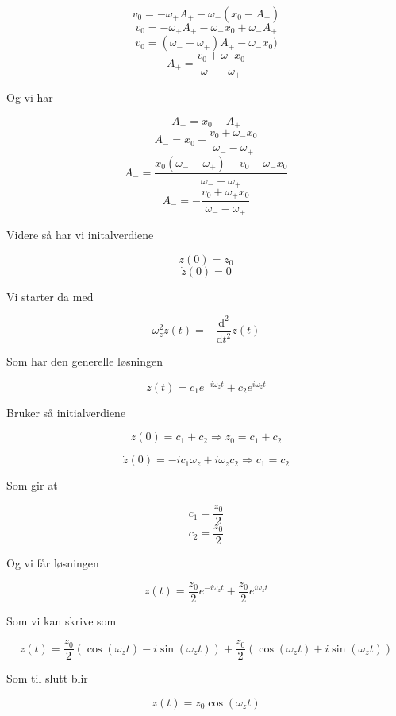 \documentclass[reprint,english,notitlepage, nofootinbib]{revtex4-1}  %
\begin{document}
$$v_0 = -\omega_+A_+-\omega_-(x_0-A_+)$$
$$v_0 = -\omega_+A_+-\omega_-x_0+\omega_-A_+$$
$$v_0 = (\omega_--\omega_+)A_+ - \omega_-x_0)$$
$$A_+ = \frac{v_0+\omega_-x_0}{\omega_--\omega_+}$$

Og vi har

$$A_- = x_0 - A_+$$
$$A_- = x_0 - \frac{v_0+\omega_-x_0}{\omega_--\omega_+}$$
$$A_- = \frac{x_0(\omega_--\omega_+)-v_0-\omega_-x_0}{\omega_--\omega_+}$$
$$A_- = -\frac{v_0+\omega_+x_0}{\omega_--\omega_+}$$

Videre så har vi initalverdiene

$$z(0) = z_0$$
$$\dot{z}(0) = 0$$

Vi starter da med

$$\omega_z^2z(t) = -\frac{\mathrm{d}^2}{\mathrm{d}t^2} z(t)$$

Som har den generelle løsningen

$$z(t) = c_1e^{-i\omega_zt} + c_2e^{i\omega_zt}$$

Bruker så initialverdiene

$$z(0) = c_1 + c_2 \Rightarrow z_0 = c_1 + c_2$$

$$\dot{z}(0) = -ic_1\omega_z + i\omega_zc_2 \Rightarrow c_1 = c_2$$

Som gir at

$$c_1 = \frac{z_0}{2}$$
$$c_2 = \frac{z_0}{2}$$

Og vi får løsningen

$$z(t) = \frac{z_0}{2}e^{-i\omega_zt} + \frac{z_0}{2}e^{i\omega_zt}$$

Som vi kan skrive som

$$z(t) = \frac{z_0}{2}(\cos{(\omega_zt) - i\sin{(\omega_zt)}}) +  \frac{z_0}{2}(\cos{(\omega_zt) + i\sin{(\omega_zt)}})$$

Som til slutt blir

$$z(t) = z_0 \cos{(\omega_zt)}$$



\clearpage
\end{document}
